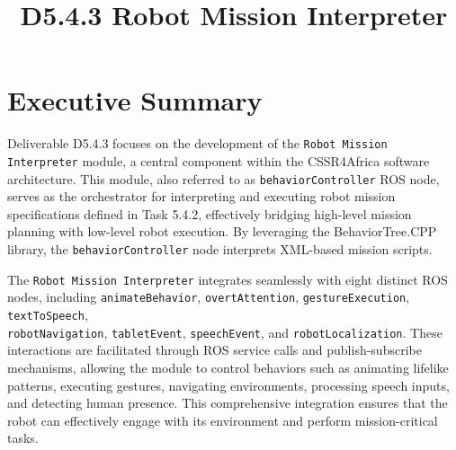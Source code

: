 \documentclass{CSSRforAfrica}
\begin{document}



\title{D5.4.3 Robot Mission Interpreter}    %





\maketitle
 
 
\section*{Executive Summary}

\label{executive_summary}
 
Deliverable D5.4.3 focuses on the development of the \texttt{\small Robot Mission Interpreter} module, a central component within the CSSR4Africa software architecture. This module, also referred to as \texttt{\small behaviorController} ROS node, serves as the orchestrator for interpreting and executing robot mission specifications defined in Task 5.4.2, effectively bridging high-level mission planning with low-level robot execution. By leveraging the BehaviorTree.CPP library, the \texttt{\small behaviorController} node interprets XML-based mission scripts.

The \texttt{\small Robot Mission Interpreter} integrates seamlessly with eight distinct ROS nodes, including \texttt{\small animateBehavior}, \texttt{\small overtAttention}, \texttt{\small gestureExecution}, \texttt{\small textToSpeech}, \\ \texttt{\small robotNavigation}, \texttt{\small tabletEvent}, \texttt{\small speechEvent}, and \texttt{\small robotLocalization}. These interactions are facilitated through ROS service calls and publish-subscribe mechanisms, allowing the module to control behaviors such as animating lifelike patterns, executing gestures, navigating environments, processing speech inputs, and detecting human presence. This comprehensive integration ensures that the robot can effectively engage with its environment and perform mission-critical tasks.
\end{document}
